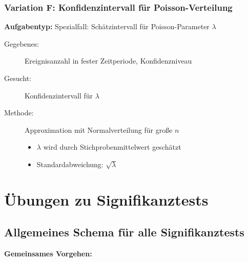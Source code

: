 \documentclass[12pt, a4paper, titlepage, ngerman]{scrartcl}
\begin{document}
\subsubsection{Variation F: Konfidenzintervall für Poisson-Verteilung}

\textbf{Aufgabentyp:} Spezialfall: Schätzintervall für Poisson-Parameter $\lambda$

\begin{description}
  \item[Gegebenes:] Ereignisanzahl in fester Zeitperiode, Konfidenzniveau
  \item[Gesucht:] Konfidenzintervall für $\lambda$
  \item[Methode:] Approximation mit Normalverteilung für große $n$
    \begin{itemize}
      \item $\lambda$ wird durch Stichprobenmittelwert geschätzt
      \item Standardabweichung: $\sqrt{\lambda}$
    \end{itemize}
\end{description}

\section{Übungen zu Signifikanztests}

\subsection{Allgemeines Schema für alle Signifikanztests}

\textbf{Gemeinsames Vorgehen:}
\end{document}
